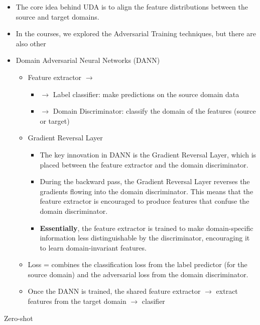 \documentclass{article}
\theoremstyle{plain}%
\theoremstyle{definition}
\theoremstyle{remark}
\begin{document}
\begin{itemize}
    \item The core idea behind UDA is to align the feature distributions between the source and target domains.
    \item In the courses, we explored the Adversarial Training techniques, but there are also other
    \item Domain Adversarial Neural Networks (DANN) \begin{itemize}
        \item Feature extractor $\rightarrow$ \begin{itemize}
            \item $\rightarrow$ Label classifier: make predictions on the source domain data
            \item $\rightarrow$ Domain Discriminator: classify the domain of the features (source or target) 
        \end{itemize}
        \item Gradient Reversal Layer \begin{itemize}
            \item The key innovation in DANN is the Gradient Reversal Layer, which is placed between the feature extractor and the domain discriminator.
            \item During the backward pass, the Gradient Reversal Layer reverses the gradients flowing into the domain discriminator. This means that the feature extractor is encouraged to produce features that confuse the domain discriminator.
            \item \textbf{Essentially}, the feature extractor is trained to make domain-specific information less distinguishable by the discriminator, encouraging it to learn domain-invariant features.
        \end{itemize}
        \item Loss =  combines the classification loss from the label predictor (for the source domain) and the adversarial loss from the domain discriminator.
        \item Once the DANN is trained, the shared feature extractor $\rightarrow$ extract features from the target domain $\rightarrow$ clasifier
    \end{itemize}
\end{itemize}
Zero-shot
\end{document}

